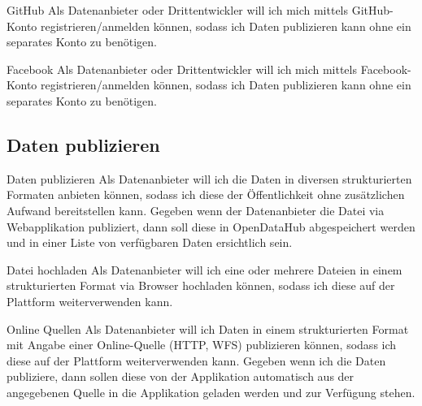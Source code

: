 \begin{scrumstory}[label=story:pd:github]{GitHub}
	Als Datenanbieter oder Drittentwickler will ich mich mittels GitHub-Konto registrieren/anmelden können, sodass ich Daten publizieren kann ohne ein separates Konto zu benötigen.
\end{scrumstory}

\begin{scrumstory}[label=story:pd:facebook]{Facebook}
	Als Datenanbieter oder Drittentwickler will ich mich mittels Facebook-Konto registrieren/anmelden können, sodass ich Daten publizieren kann ohne ein separates Konto zu benötigen.
\end{scrumstory}


\subsection{Daten publizieren}

\begin{scrumepic}[label=epic:pd:publizieren]{Daten publizieren}
	Als Datenanbieter will ich die Daten in diversen strukturierten Formaten anbieten können, sodass ich diese der Öffentlichkeit ohne zusätzlichen Aufwand bereitstellen kann.
	\storyacceptance	
	Gegeben
	wenn der Datenanbieter die Datei via Webapplikation publiziert, dann soll diese in OpenDataHub abgespeichert werden und in einer Liste von verfügbaren Daten ersichtlich sein.
\end{scrumepic}

\begin{scrumstory}[label=story:pd:hochladen]{Datei hochladen}
	Als Datenanbieter will ich eine oder mehrere Dateien in einem strukturierten Format via Browser hochladen können, sodass ich diese auf der Plattform weiterverwenden kann.
\end{scrumstory}

\begin{scrumstory}[label=story:pd:online-quelle]{Online Quellen}
	Als Datenanbieter will ich Daten in einem strukturierten Format mit Angabe einer Online-Quelle (HTTP, WFS) publizieren können, sodass ich diese auf der Plattform weiterverwenden kann.
	\storyacceptance	
	Gegeben
	wenn ich die Daten publiziere, dann sollen diese von der Applikation automatisch aus der angegebenen Quelle in die Applikation geladen werden und zur Verfügung stehen.
\end{scrumstory}

